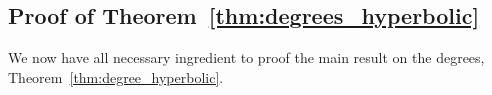 %
%

\subsection{Proof of Theorem~\ref{thm:degrees_hyperbolic}}\label{ssec:proof_thm_degrees}

We now have all necessary ingredient to proof the main result on the degrees, Theorem~\ref{thm:degree_hyperbolic}.

